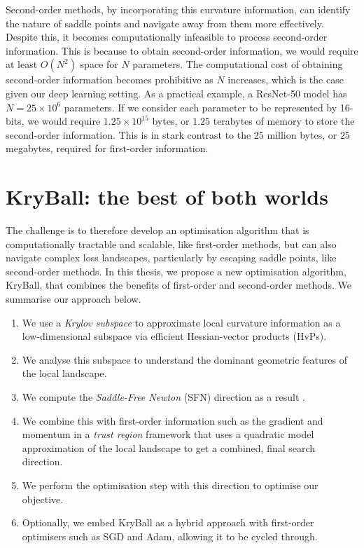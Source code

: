 Second-order methods, by incorporating this curvature information, can identify the nature of saddle points and navigate away from them more effectively. Despite this, it becomes computationally infeasible to process second-order information. This is because to obtain second-order information, we would require at least $O(N^2)$ space for $N$ parameters. The computational cost of obtaining second-order information becomes prohibitive as $N$ increases, which is the case given our deep learning setting. As a practical example, a ResNet-50 model has $N = 25 \times 10^6$ parameters. If we consider each parameter to be represented by 16-bits, we would require $1.25 \times 10^{15}$ bytes, or $1.25$ terabytes of memory to store the second-order information. This is in stark contrast to the $25$ million bytes, or $25$ megabytes, required for first-order information.

\section{KryBall: the best of both worlds}
\label{sec:kryball_intro}

The challenge is to therefore develop an optimisation algorithm that is computationally tractable and scalable, like first-order methods, but can also navigate complex loss landscapes, particularly by escaping saddle points, like second-order methods. In this thesis, we propose a new optimisation algorithm, KryBall, that combines the benefits of first-order and second-order methods. We summarise our approach below.

\begin{enumerate}
  \item We use a \textit{Krylov subspace} to approximate local curvature information as a low-dimensional subspace via efficient Hessian-vector products (HvPs).
  \item We analyse this subspace to understand the dominant geometric features of the local landscape. 
  \item We compute the \textit{Saddle-Free Newton} (SFN) direction as a result \citep{dauphin2014sfn}.
  \item We combine this with first-order information such as the gradient and momentum in a \textit{trust region} framework that uses a quadratic model approximation of the local landscape to get a combined, final search direction.
  \item We perform the optimisation step with this direction to optimise our objective.
  \item Optionally, we embed KryBall as a hybrid approach with first-order optimisers such as SGD and Adam, allowing it to be cycled through.
\end{enumerate}

